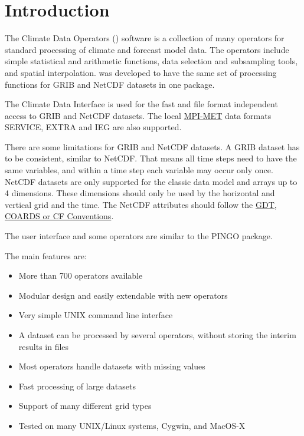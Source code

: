 \chapter{Introduction}

The Climate Data Operators ({\CDO}) software is a collection of many operators
for standard processing of climate and forecast model data.
The operators include simple statistical and arithmetic functions, data selection
and subsampling tools, and spatial interpolation.
{\CDO} was developed to have the same set of processing functions for GRIB \cite{GRIB} and NetCDF \cite{NetCDF}
datasets in one package.

The Climate Data Interface \cite{CDI} is used for the fast and file format
independent access to GRIB and NetCDF datasets.
The local \href{http://www.mpimet.mpg.de/}{MPI-MET} data formats SERVICE, EXTRA and 
IEG are also supported.

There are some limitations for GRIB and NetCDF datasets.
A GRIB dataset has to be consistent, similar to NetCDF.
That means all time steps need to have the same variables, and
within a time step each variable may occur only once.
NetCDF datasets are only supported for the classic data model and arrays up to 4 dimensions.
These dimensions should only be used by the horizontal and vertical grid and the time.
The NetCDF attributes should follow the
\href{http://ftp.unidata.ucar.edu/software/netcdf/docs/conventions.html}
     {GDT, COARDS or CF Conventions}.

The user interface and some operators are similar to the PINGO \cite{PINGO} package.

The main {\CDO} features are:
\begin{itemize}
\item More than 700 operators available
\item Modular design and easily extendable with new operators
\item Very simple UNIX command line interface
\item A dataset can be processed by several operators,
      without storing the interim results in files %
\item Most operators handle datasets with missing values
\item Fast processing of large datasets
\item Support of many different grid types
\item Tested on many UNIX/Linux systems, Cygwin, and MacOS-X
\end{itemize}
















